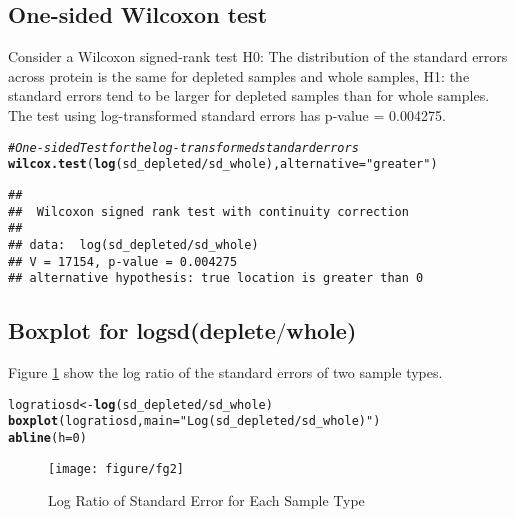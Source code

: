 \documentclass{article}\usepackage[]{graphicx}\usepackage[]{color}
\makeatletter
\def\maxwidth{ %
  \ifdim\Gin@nat@width>\linewidth
    \linewidth
  \else
    \Gin@nat@width
  \fi
}
\newcommand{\hlnum}[1]{\textcolor[rgb]{0.686,0.059,0.569}{#1}}%
\newcommand{\hlstr}[1]{\textcolor[rgb]{0.192,0.494,0.8}{#1}}%
\newcommand{\hlcom}[1]{\textcolor[rgb]{0.678,0.584,0.686}{\textit{#1}}}%
\newcommand{\hlopt}[1]{\textcolor[rgb]{0,0,0}{#1}}%
\newcommand{\hlstd}[1]{\textcolor[rgb]{0.345,0.345,0.345}{#1}}%
\newcommand{\hlkwb}[1]{\textcolor[rgb]{0.69,0.353,0.396}{#1}}%
\newcommand{\hlkwc}[1]{\textcolor[rgb]{0.333,0.667,0.333}{#1}}%
\newcommand{\hlkwd}[1]{\textcolor[rgb]{0.737,0.353,0.396}{\textbf{#1}}}%
\newenvironment{kframe}{%
 \def\at@end@of@kframe{}%
 \ifinner\ifhmode%
  \def\at@end@of@kframe{\end{minipage}}%
  \begin{minipage}{\columnwidth}%
 \fi\fi%
 \def\FrameCommand##1{\hskip\@totalleftmargin \hskip-\fboxsep
 \colorbox{shadecolor}{##1}\hskip-\fboxsep
     \hskip-\linewidth \hskip-\@totalleftmargin \hskip\columnwidth}%
 \MakeFramed {\advance\hsize-\width
   \@totalleftmargin\z@ \linewidth\hsize
   \@setminipage}}%
 {\par\unskip\endMakeFramed%
 \at@end@of@kframe}
\newenvironment{knitrout}{}{} %
\makeatother
\begin{document}
\subsection{One-sided Wilcoxon test}
Consider a Wilcoxon signed-rank test H0: The distribution of the  standard errors across protein   is the same for  depleted samples and whole samples, H1: the standard errors tend to be larger for depleted samples than for whole samples.  The test using log-transformed standard errors has p-value = 0.004275. 

\begin{knitrout}
\color{fgcolor}\begin{kframe}
\begin{alltt}
\hlcom{# One-sided Test for the log-transformed standard errors}
\hlkwd{wilcox.test}\hlstd{(}\hlkwd{log}\hlstd{(sd_depleted}\hlopt{/}\hlstd{sd_whole),} \hlkwc{alternative} \hlstd{=} \hlstr{"greater"}\hlstd{)}
\end{alltt}
\begin{verbatim}
## 
## 	Wilcoxon signed rank test with continuity correction
## 
## data:  log(sd_depleted/sd_whole)
## V = 17154, p-value = 0.004275
## alternative hypothesis: true location is greater than 0
\end{verbatim}
\end{kframe}
\end{knitrout}


\subsection{Boxplot for logsd(deplete$/$whole)}
Figure \ref{fig:fg2} show the log ratio of the standard errors of two sample types.

\begin{knitrout}
\color{fgcolor}\begin{kframe}
\begin{alltt}
\hlstd{logratiosd} \hlkwb{<-} \hlkwd{log}\hlstd{(sd_depleted}\hlopt{/}\hlstd{sd_whole)}
\hlkwd{boxplot}\hlstd{(logratiosd,} \hlkwc{main} \hlstd{=} \hlstr{"Log(sd_depleted/sd_whole)"}\hlstd{)}
\hlkwd{abline}\hlstd{(}\hlkwc{h} \hlstd{=} \hlnum{0}\hlstd{)}
\end{alltt}
\end{kframe}\begin{figure}[h]

\texttt{[image: figure/fg2]} \caption[Log Ratio of Standard Error for Each Sample Type]{Log Ratio of Standard Error for Each Sample Type\label{fig:fg2}}
\end{figure}


\end{knitrout}
\end{document}
